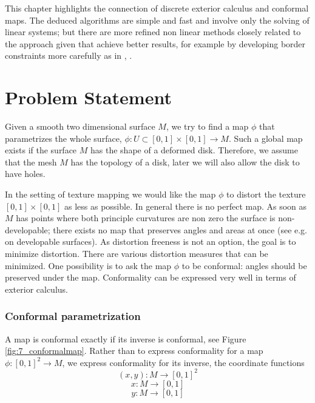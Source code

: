 This chapter highlights the connection of discrete exterior calculus and conformal maps. The deduced algorithms are simple and fast and involve only the solving of linear systems; but there are more refined non linear methods closely related to the approach given that achieve better results, for example by developing border constraints more carefully as in  \cite{meshpar1}, \cite{meshpar2}.


\section{Problem Statement}
	Given a smooth two dimensional surface $M$, we try to find a map $\phi$ that parametrizes the whole surface, $\phi: U \subset [0,1]\times [0,1] \rightarrow M$. Such a global map exists if the surface $M$ has the shape of a deformed disk. Therefore, we assume that the mesh $M$ has the topology of a disk, later we will also allow the disk to have holes. 
	
In the setting of texture mapping we would like the map $\phi$ to distort the texture $[0,1]\times [0,1]$ as less as possible. In general there is no perfect map. As soon as $M$ has points where both principle curvatures are non zero the surface is non-developable; there exists no map that preserves angles and areas at once (see e.g. \cite{ carmo1992differentialgeometrie} on developable surfaces). As distortion freeness is not an option, the goal is to minimize distortion. There are various distortion measures that can be minimized. One possibility is to ask the map $\phi$ to be conformal: angles should be preserved under the map. 
Conformality can be expressed very well in terms of exterior calculus. 

\subsubsection{Conformal parametrization}
A map is conformal exactly if its inverse is conformal, see Figure \ref{fig:7_conformalmap}. Rather than to express conformality for a map $\phi:[0,1]^2\rightarrow M$, we express conformality for its inverse, the coordinate functions
\[(x,y): M \rightarrow [0,1]^2\]
\[x:M \rightarrow [0,1]\]
\[y:M \rightarrow [0,1]\]

